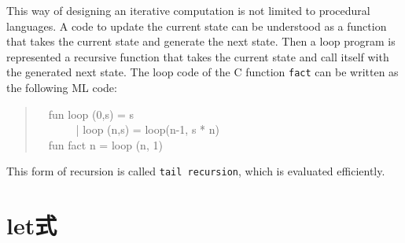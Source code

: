 \documentclass{jbook}
\newcommand{\txt}[2]{#1}
\newcommand{\myem}{\mbox{\ \ }}
\begin{document}
	This way of designing an iterative computation is not limited to
procedural languages.
	A code to update the current state can be understood as a
function that takes the current state and generate the next state.
	Then a loop program is represented a recursive function that
takes the current state and call itself with the generated next state.
	The loop code of the C function {\tt fact} can be written as
the following ML code:
\begin{tt}
\begin{quote}
\myem  fun loop (0,s) = s\\
\myem \ \ \ \ \    | loop (n,s) = loop(n-1, s * n)\\
\myem fun fact n = loop (n, 1)
\end{quote}
\end{tt}
	This form of recursion is called {\tt tail recursion}, which is
evaluated efficiently.
\fi%

\section{\txt{let式}{let expressions}}
\label{sec:tutorialLetexpression}
\end{document}
